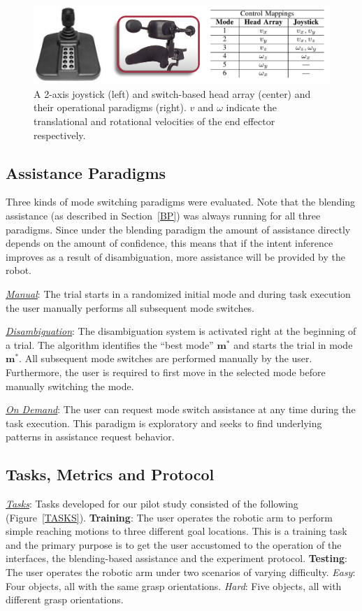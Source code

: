 \documentclass[conference]{IEEEtran}
\begin{document}
   \begin{figure}[h]
 	\centering
 	\includegraphics[width = 0.9\hsize, height = 0.09\vsize]{./figures/INTER.png}
 	\caption{A 2-axis joystick (left) and switch-based head array (center) and their operational paradigms (right). $v$ and $\omega$ indicate the translational and rotational velocities of the end effector respectively.}
 	\label{J2_HA}
 \end{figure}
 \subsection{Assistance Paradigms}
 Three kinds of mode switching paradigms were evaluated. Note that the blending assistance (as described in Section~\ref{BP}) was always running for all three paradigms. Since under the blending paradigm the amount of assistance directly depends on the amount of confidence, this means that if the intent inference improves as a result of disambiguation, more assistance will be provided by the robot.
 
 \noindent\underline{\textit{Manual}}: The trial starts in a randomized initial mode and during task execution the user manually performs all subsequent mode switches.
 
 \noindent\underline{\textit{Disambiguation}}: The disambiguation system is activated right at the beginning of a trial. The algorithm identifies the ``best mode'' $\boldsymbol{m}^*$ and starts the trial in mode $\boldsymbol{m}^*$. All subsequent mode switches are performed manually by the user. Furthermore, the user is required to first move in the selected mode before manually switching the mode. 
 
 \noindent\underline{\textit{On Demand}}: The user can request mode switch assistance at any time during the task execution. This paradigm is exploratory and seeks to find underlying patterns in assistance request behavior.
 
\subsection{Tasks, Metrics and Protocol}

\noindent\underline{\textit{Tasks}}: Tasks developed for our pilot study consisted of the following (Figure~\ref{TASKS}). \textbf{Training}: The user operates the robotic arm to perform simple reaching motions to three different goal locations. This is a training task and the primary purpose is to get the user accustomed to the operation of the interfaces, the blending-based assistance and the experiment protocol. \textbf{Testing}: The user operates the robotic arm under two scenarios of varying difficulty. \textit{Easy}: Four objects, all with the same grasp orientations. \textit{Hard}: Five objects, all with different grasp orientations.
\end{document}
